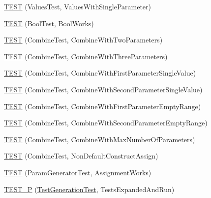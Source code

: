 \begin{DoxyCompactItemize}
\item 
\mbox{\hyperlink{googletest-master_2googletest_2test_2googletest-param-test-test_8cc_af5c833610dcfcdfed7bcaa5f2e7dcf16}{T\+E\+ST}} (Values\+Test, Values\+With\+Single\+Parameter)
\item 
\mbox{\hyperlink{googletest-master_2googletest_2test_2googletest-param-test-test_8cc_a3f3ae54fc86fcf5881329fb7e8e4b8ee}{T\+E\+ST}} (Bool\+Test, Bool\+Works)
\item 
\mbox{\hyperlink{googletest-master_2googletest_2test_2googletest-param-test-test_8cc_a44831b3cbd99dd9df97741b57ce5f54c}{T\+E\+ST}} (Combine\+Test, Combine\+With\+Two\+Parameters)
\item 
\mbox{\hyperlink{googletest-master_2googletest_2test_2googletest-param-test-test_8cc_abb0566c1dd1e93b040122f62019342b7}{T\+E\+ST}} (Combine\+Test, Combine\+With\+Three\+Parameters)
\item 
\mbox{\hyperlink{googletest-master_2googletest_2test_2googletest-param-test-test_8cc_a93f6f860828c8e67a9bf8b8e254d8bde}{T\+E\+ST}} (Combine\+Test, Combine\+With\+First\+Parameter\+Single\+Value)
\item 
\mbox{\hyperlink{googletest-master_2googletest_2test_2googletest-param-test-test_8cc_aa3972149c4cee8b2e4aa42890cf6faca}{T\+E\+ST}} (Combine\+Test, Combine\+With\+Second\+Parameter\+Single\+Value)
\item 
\mbox{\hyperlink{googletest-master_2googletest_2test_2googletest-param-test-test_8cc_a05e6de39d2004ec6509fd02c41b1f941}{T\+E\+ST}} (Combine\+Test, Combine\+With\+First\+Parameter\+Empty\+Range)
\item 
\mbox{\hyperlink{googletest-master_2googletest_2test_2googletest-param-test-test_8cc_aa40c83cd556e38939e00465e2a18d035}{T\+E\+ST}} (Combine\+Test, Combine\+With\+Second\+Parameter\+Empty\+Range)
\item 
\mbox{\hyperlink{googletest-master_2googletest_2test_2googletest-param-test-test_8cc_a9e14f2d8d5c981a66a27e50a597adc3c}{T\+E\+ST}} (Combine\+Test, Combine\+With\+Max\+Number\+Of\+Parameters)
\item 
\mbox{\hyperlink{googletest-master_2googletest_2test_2googletest-param-test-test_8cc_a67908fbc85ddfdda8ce3e8a4282115f7}{T\+E\+ST}} (Combine\+Test, Non\+Default\+Construct\+Assign)
\item 
\mbox{\hyperlink{googletest-master_2googletest_2test_2googletest-param-test-test_8cc_aca8e985a9ed651999aed02287e9e67ba}{T\+E\+ST}} (Param\+Generator\+Test, Assignment\+Works)
\item 
\mbox{\hyperlink{googletest-master_2googletest_2test_2googletest-param-test-test_8cc_a6c5cf7b74d0cec5d5170659d1d31b560}{T\+E\+S\+T\+\_\+P}} (\mbox{\hyperlink{class_test_generation_test}{Test\+Generation\+Test}}, Tests\+Expanded\+And\+Run)

\end{DoxyCompactItemize}
